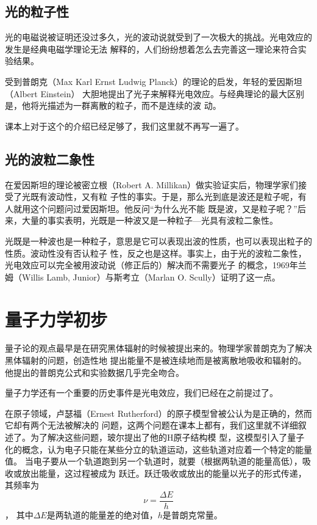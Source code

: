 \subsection{光的粒子性}
光的电磁说被证明还没过多久，光的波动说就受到了一次极大的挑战。光电效应的发生是经典电磁学理论无法
解释的，人们纷纷想着怎么去完善这一理论来符合实验结果。

受到普朗克（Max Karl Ernst Ludwig Planck）的理论的启发，年轻的爱因斯坦（Albert Einstein）
大胆地提出了光子来解释光电效应。与经典理论的最大区别是，他将光描述为一群离散的粒子，而不是连续的波
动。

课本上对于这个的介绍已经足够了，我们这里就不再写一遍了。

\subsection{光的波粒二象性}
在爱因斯坦的理论被密立根（Robert A. Millikan）做实验证实后，物理学家们接受了光既有波动性，又有粒
子性的事实。于是，那么光到底是波还是粒子呢，有人就用这个问题问过爱因斯坦。他反问``为什么光不能
既是波，又是粒子呢？''后来，大量的事实表明，光既是一种波又是一种粒子---光具有波粒二象性。

光既是一种波也是一种粒子，意思是它可以表现出波的性质，也可以表现出粒子的性质。波动性没有否认粒子
性，反之也是这样。事实上，由于光的波粒二象性，光电效应可以完全被用波动说（修正后的）解决而不需要光子
的概念，1969年兰姆（Willis Lamb, Junior）与斯考立（Marlan O. Scully）证明了这一点。

\section{量子力学初步}
量子论的观点最早是在研究黑体辐射的时候被提出来的。物理学家普朗克为了解决黑体辐射的问题，创造性地
提出能量不是被连续地而是被离散地吸收和辐射的。他提出的普朗克公式和实验数据几乎完全吻合。

量子力学还有一个重要的历史事件是光电效应，我们已经在之前提过了。

在原子领域，卢瑟福（Ernest Rutherford）的原子模型曾被公认为是正确的，然而它却有两个无法被解决的
问题，这两个问题在课本上都有，我们这里就不详细叙述了。为了解决这些问题，玻尔提出了他的H原子结构模
型，这模型引入了量子化的概念，认为电子只能在某些分立的轨道运动，这些轨道对应着一个特定的能量值。
当电子要从一个轨道跑到另一个轨道时，就要（根据两轨道的能量高低），吸收或放出能量，这过程被成为
跃迁。跃迁吸收或放出的能量以光子的形式传递，其频率为
\begin{equation}
\nu = \frac{\Delta E}{h}
\end{equation}，
其中$\Delta E$是两轨道的能量差的绝对值，$h$是普朗克常量。

